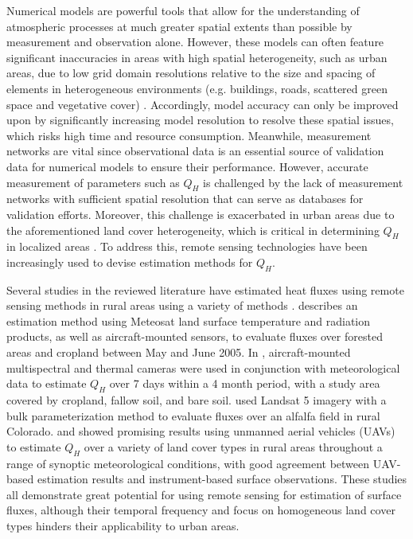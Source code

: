 Numerical models are powerful tools that allow for the understanding of atmospheric processes at much greater spatial extents than possible by measurement and observation alone. However, these models can often feature significant inaccuracies in areas with high spatial heterogeneity, such as urban areas, due to low grid domain resolutions relative to the size and spacing of elements in heterogeneous environments (e.g. buildings, roads, scattered green space and vegetative cover) \citep{Chen_2011, Hong_2012, Leroyer_2014}. Accordingly, model accuracy can only be improved upon by significantly increasing model resolution to resolve these spatial issues, which risks high time and resource consumption.  Meanwhile, measurement networks are vital since observational data is an essential source of validation data for numerical models to ensure their performance. However, accurate measurement of parameters such as $Q_H$ is challenged by the lack of measurement networks with sufficient spatial resolution that can serve as databases for validation efforts. Moreover, this challenge is exacerbated in urban areas due to the aforementioned land cover heterogeneity, which is critical in determining $Q_H$ in localized areas \citep{Feddema_2005, Wang_2016}. To address this, remote sensing technologies have been increasingly used to devise estimation methods for $Q_H$.

Several studies in the reviewed literature have estimated heat fluxes using remote sensing methods in rural areas using a variety of methods \citep{Cammalleri_2012, Kim_2019, Miglietta_2009, Mkhwanazi_2012, Ortega-Farias_2016}.  \citet{Miglietta_2009} describes an estimation method using Meteosat land surface temperature and radiation products, as well as aircraft-mounted sensors, to evaluate fluxes over forested areas and cropland between May and June 2005.  In \citet{Cammalleri_2012}, aircraft-mounted multispectral and thermal cameras were used in conjunction with meteorological data to estimate $Q_H$ over 7 days within a 4 month period, with a study area covered by cropland, fallow soil, and bare soil.  \citet{Mkhwanazi_2012} used Landsat 5 imagery with a bulk parameterization method to evaluate fluxes over an alfalfa field in rural Colorado. \citet{Kim_2019} and \citet{Ortega-Farias_2016}  showed promising results using unmanned aerial vehicles (UAVs) to estimate $Q_H$ over a variety of land cover types in rural areas throughout a range of synoptic meteorological conditions, with good agreement between UAV-based estimation results and instrument-based surface observations. These studies all demonstrate great potential for using remote sensing for estimation of surface fluxes, although their temporal frequency and focus on homogeneous land cover types hinders their applicability to urban areas.

